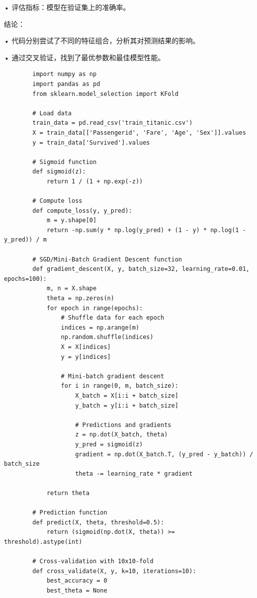 \documentclass[12pt,a4paper,oneside]{article}
\begin{document}
	•	评估指标：模型在验证集上的准确率。

	结论：

	•	代码分别尝试了不同的特征组合，分析其对预测结果的影响。

	•	通过交叉验证，找到了最优参数和最佳模型性能。

    \begin{lstlisting}
        import numpy as np
        import pandas as pd
        from sklearn.model_selection import KFold
        
        # Load data
        train_data = pd.read_csv('train_titanic.csv')
        X = train_data[['Passengerid', 'Fare', 'Age', 'Sex']].values
        y = train_data['Survived'].values
        
        # Sigmoid function
        def sigmoid(z):
            return 1 / (1 + np.exp(-z))
        
        # Compute loss
        def compute_loss(y, y_pred):
            m = y.shape[0]
            return -np.sum(y * np.log(y_pred) + (1 - y) * np.log(1 - y_pred)) / m
        
        # SGD/Mini-Batch Gradient Descent function
        def gradient_descent(X, y, batch_size=32, learning_rate=0.01, epochs=100):
            m, n = X.shape
            theta = np.zeros(n)
            for epoch in range(epochs):
                # Shuffle data for each epoch
                indices = np.arange(m)
                np.random.shuffle(indices)
                X = X[indices]
                y = y[indices]
                
                # Mini-batch gradient descent
                for i in range(0, m, batch_size):
                    X_batch = X[i:i + batch_size]
                    y_batch = y[i:i + batch_size]
                    
                    # Predictions and gradients
                    z = np.dot(X_batch, theta)
                    y_pred = sigmoid(z)
                    gradient = np.dot(X_batch.T, (y_pred - y_batch)) / batch_size
                    theta -= learning_rate * gradient
        
            return theta
        
        # Prediction function
        def predict(X, theta, threshold=0.5):
            return (sigmoid(np.dot(X, theta)) >= threshold).astype(int)
        
        # Cross-validation with 10x10-fold
        def cross_validate(X, y, k=10, iterations=10):
            best_accuracy = 0
            best_theta = None
            

\end{lstlisting}
\end{document}
